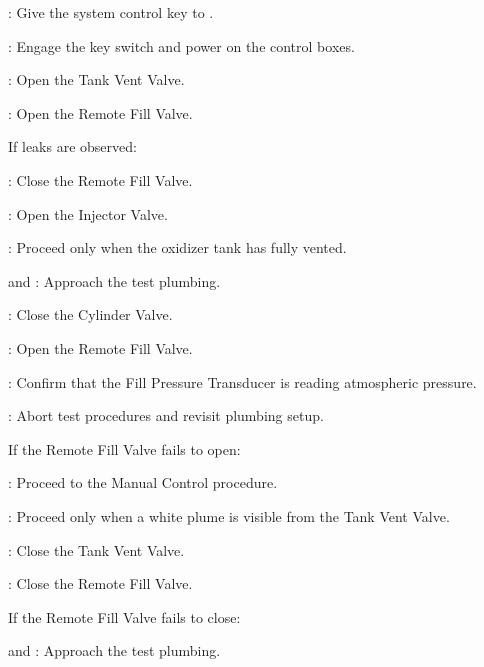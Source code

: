 \begin{checklist}
\begin{checklist}
    \end{checklist}
    \item \secondary: Give the system control key to \primary{}.
    \item \primary{}: Engage the key switch and power on the control boxes.
    \item \primary{}: Open the Tank Vent Valve.
    \item \primary{}: Open the Remote Fill Valve.
    \begin{checklist}[label=$\bullet$]
        \item If leaks are observed:
        \begin{checklist}
            \item \primary{}: Close the Remote Fill Valve.
            \item \primary{}: Open the Injector Valve.
            \item \secondary: Proceed only when the oxidizer tank has fully vented.
            \item \primary{} and \secondary: Approach the test plumbing.
            \item \primary{}: Close the Cylinder Valve.
            \item \primary{}: Open the Remote Fill Valve.
            \item \daq{}: Confirm that the Fill Pressure Transducer is reading atmospheric pressure.
            \item \ops{}: Abort test procedures and revisit plumbing setup.
        \end{checklist}
        \item If the Remote Fill Valve fails to open:
        \begin{checklist}
            \item \ops{}: Proceed to the Manual Control procedure.
        \end{checklist}
    \end{checklist}
    \item \secondary{}: Proceed only when a white plume is visible from the Tank Vent Valve.
    \item \primary{}: Close the Tank Vent Valve.
    \item \primary{}: Close the Remote Fill Valve.
    \begin{checklist}[label=$\bullet$]
        \item If the Remote Fill Valve fails to close:
        \begin{checklist}
            \item \primary{} and \secondary: Approach the test plumbing.

\end{checklist}
\end{checklist}
\end{checklist}
